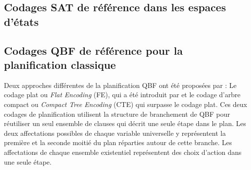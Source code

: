 \subsection{Codages SAT de référence dans les espaces d'états}%
%













\subsection{Codages QBF de référence pour la planification classique}\label{chap:codages:qbf:reference}
%

Deux approches différentes de la planification QBF ont été proposées par \cite{DBLP:conf/ecai/CashmoreFG12}:
Le codage plat ou \textit{Flat Encoding} (FE), qui a été introduit par \cite{DBLP:conf/lpar/Rintanen01} et le codage d'arbre compact ou \textit{Compact Tree Encoding} (CTE)  %
\cite{DBLP:conf/ecai/CashmoreFG12} %
qui surpasse le codage plat.
Ces deux codages de planification utilisent la structure de branchement de QBF pour réutiliser un seul ensemble de clauses qui décrit une seule étape dans le plan. Les deux affectations possibles de chaque variable universelle y représentent la première et la seconde moitié du plan réparties autour de cette branche. Les affectations de chaque ensemble existentiel représentent des choix d'action dans une seule étape.

